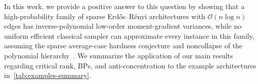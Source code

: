 \documentclass{article}
\theoremstyle{plain}
\theoremstyle{definition}
\theoremstyle{remark}
\begin{document}
In this work, we provide a positive answer to this question by showing that a high-probability family of sparse Erd\H{o}s--R\'enyi architectures with $\mathcal{O}(n\log n)$ edges has inverse-polynomial low-order moment-gradient variances, while no uniform efficient classical sampler can approximate every instance in this family, assuming the sparse average-case hardness conjecture and noncollapse of the polynomial hierarchy~\citep{Bremner17}. We summarize the application of our main results regarding critical rank, BPs, and anti-concentration to the example architectures in~\cref{tab:examples-summary}.


\end{document}
